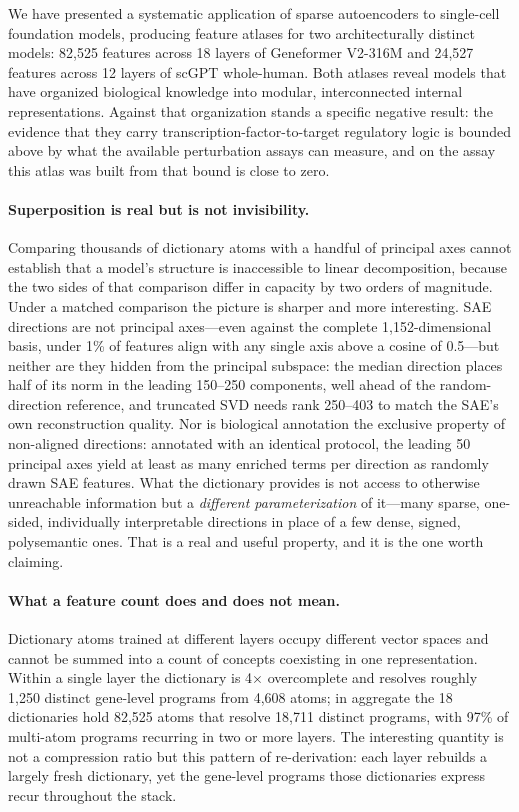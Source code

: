 We have presented a systematic application of sparse autoencoders to single-cell foundation models,
producing feature atlases for two architecturally distinct models: 82,525 features across 18 layers
of Geneformer V2-316M and 24,527 features across 12 layers of scGPT whole-human. Both atlases
reveal models that have organized biological knowledge into modular, interconnected internal
representations. Against that organization stands a specific negative result: the evidence that they carry
transcription-factor-to-target regulatory logic is bounded above by what the available perturbation
assays can measure, and on the assay this atlas was built from that bound is close to zero.

\paragraph{Superposition is real but is not invisibility.}
Comparing thousands of dictionary atoms with a handful of principal axes cannot establish that a
model's structure is inaccessible to linear decomposition, because the two sides of that comparison
differ in capacity by two orders of magnitude. Under a matched comparison the picture is sharper and
more interesting. SAE directions are not principal axes---even against the complete
1,152-dimensional basis, under 1\% of features align with any single axis above a cosine of 0.5---but
neither are they hidden from the principal subspace: the median direction places half of its norm
in the leading 150--250 components, well ahead of the random-direction reference, and truncated SVD
needs rank 250--403 to match the SAE's own reconstruction quality. Nor is biological annotation the
exclusive property of non-aligned directions: annotated with an identical protocol, the leading 50
principal axes yield at least as many enriched terms per direction as randomly drawn SAE features.
What the dictionary provides is not access to otherwise unreachable information but a
\emph{different parameterization} of it---many sparse, one-sided, individually interpretable
directions in place of a few dense, signed, polysemantic ones. That is a real and useful property,
and it is the one worth claiming.

\paragraph{What a feature count does and does not mean.}
Dictionary atoms trained at different layers occupy different vector spaces and cannot be summed
into a count of concepts coexisting in one representation. Within a single layer the dictionary is
4$\times$ overcomplete and resolves roughly 1,250 distinct gene-level programs from 4,608 atoms; in
aggregate the 18 dictionaries hold 82,525 atoms that resolve 18,711 distinct programs, with 97\% of
multi-atom programs recurring in two or more layers. The interesting quantity is not a compression
ratio but this pattern of re-derivation: each layer rebuilds a largely fresh dictionary, yet the
gene-level programs those dictionaries express recur throughout the stack.

